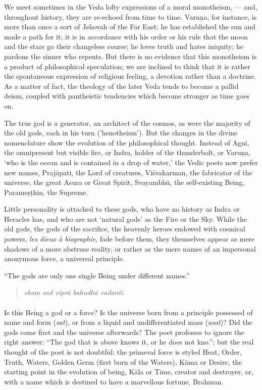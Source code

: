 \documentclass[a4paper, 11pt, oneside, english]{article}
\begin{document}
We meet sometimes in the Veda lofty expressions of a moral monotheism, --- and, throughout history, they are re-echoed from time to time. Varuṇa, for instance, is more than once a sort of Jehovah of the Far East: he has established the sun and made a path for it; it is in accordance with his order or his rule that the moon and the stars go their changeless course; he loves truth and hates iniquity; he pardons the sinner who repents. But there is no evidence that this monotheism is a product of philosophical speculation; we are inclined to think that it is rather the spontaneous expression of religious feeling, a devotion rather than a doctrine. As a matter of fact, the theology of the later Veda tends to become a pallid deism, coupled with pantheistic tendencies which become stronger as time goes on.

The true god is a generator, an architect of the cosmos, as were the majority of the old gods, each in his turn ('henotheism'). But the changes in the divine nomenclature show the evolution of the philosophical thought. Instead of Agni, the omnipresent but visible fire, or Indra, holder of the thunderbolt, or Varuṇa, `who is the ocean and is contained in a drop of water,' the Vedic poets now prefer new names, Prajāpati, the Lord of creatures, Viśvakarman, the fabricator of the universe, the great Asura or Great Spirit, Svayambhū, the self-existing Being, Parameṣṭhin, the Supreme.

Little personality is attached to these gods, who have no history as Indra or Heracles has, and who are not `natural gods' as the Fire or the Sky. While the old gods, the gods of the sacrifice, the heavenly heroes endowed with cosmical powers, \emph{les dieux à biographie}, fade before them, they themselves appear as mere shadows of a more abstruse reality, or rather as the mere names of an impersonal anonymous force, a universal principle.

``The gods are only one single Being under different names.''
\begin{quotation}
\small
\emph{ekaṃ sad viprā bahudhā vadanti}.
\end{quotation}
\paragraph{}
Is this Being a god or a force? Is the universe born from a principle possessed of name and form (\emph{sat}), or from a liquid and undifferentiated mass (\emph{asat})? Did the gods come first and the universe afterwards? The poet professes to ignore the right answer: ``The god that is above knows it, or he does not kno.''; but the real thought of the poet is not doubtful: the primeval force is styled Heat, Order, Truth, Waters, Golden Germ (first born of the Waters), Kāma or Desire, the starting point in the evolution of being, Kāla or Time, creator and destroyer, or, with a name which is destined to have a marvellous fortune, Brahman.
\end{document}
